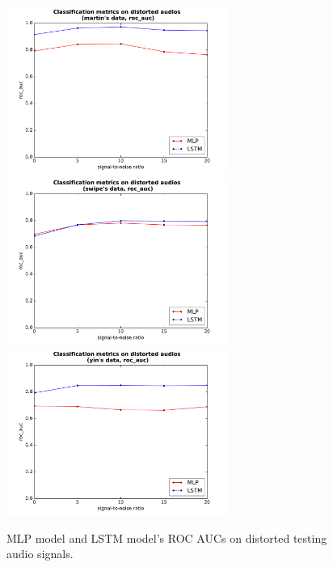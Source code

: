 \documentclass[11pt,a4paper]{report}
\begin{document}
\begin{figure}[htbp]
  \centering
  \includegraphics[width=0.65\textwidth]{classification_metrics_whole_martin_roc_auc.pdf}
  \includegraphics[width=0.65\textwidth]{classification_metrics_whole_swipe_roc_auc.pdf}
  \includegraphics[width=0.65\textwidth]{classification_metrics_whole_yin_roc_auc.pdf}
  \caption{MLP model and LSTM model's ROC AUCs on distorted testing audio signals.}
  \label{fig:distorted-testing-data-roc-auc-whole}
\end{figure}
\end{document}
